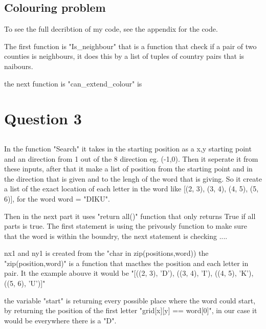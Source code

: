 \documentclass{article}
\begin{document}
\subsection{Colouring problem}

To see the full decribtion of my code, see the appendix for the code. 

The first function is "Is_neighbour" that is a function that check if a pair of two counties is neighbours, it does this by a list of tuples of country pairs that is naibours.

the next function is "can_extend_colour" is 



\section{ Question 3}


\subsection{}

\subsection{}



In the function "Search" it takes in the starting position as a x,y starting point and an direction from 1 out of the 8 direction eg. (-1,0). Then it seperate it from these inputs, after that it make a list of position from the starting point and in the direction that is given and to the lengh of the word that is giving. So it create a list of the exact location of each letter in the word like [(2, 3), (3, 4), (4, 5), (5, 6)], for the word word = "DIKU".

Then in the next part it uses "return all()" function that only returns True if all parts is true. The first statement is using the privously function to make sure that the word is within the boundry, the next statement is checking ....

nx1 and ny1 is created from the "char in zip(positions,word)) the "zip(position,word)" is a function that macthes the position and each letter in pair. It the example abouve it would be "[((2, 3), 'D'), ((3, 4), 'I'), ((4, 5), 'K'), ((5, 6), 'U')]"


the variable "start" is returning every possible place where the word could start, by returning the position of the first letter "grid[x][y] == word[0]", in our case it would be everywhere there is a "D".
\end{document}
